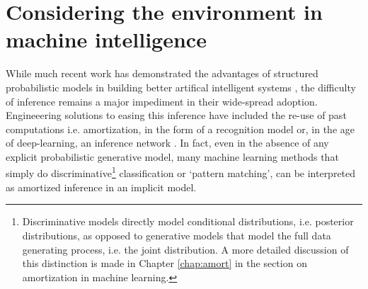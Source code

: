 
\section*{Considering the environment in machine intelligence}

While much recent work has demonstrated the advantages of structured probabilistic models in building better artifical intelligent systems \cite{lake2015human, del2013understanding, zhao2011image, steyvers2007probabilistic}, the difficulty of inference remains a major impediment in their wide-spread adoption. Engineeering solutions to easing this inference have included the re-use of past computations i.e. amortization, in the form of a recognition model\cite{dayan1995helmholtz, kingma2014auto} or, in the age of deep-learning, an inference network \citep{kulkarni2015picture, mnih2014neural, rezende2015variational, paige2016inference}. In fact, even in the absence of any explicit probabilistic generative model, many machine learning methods that simply do discriminative\footnote{Discriminative models directly model conditional distributions, i.e. posterior distributions, as opposed to generative models that model the full data generating process, i.e. the joint distribution. A more detailed discussion of this distinction is made in Chapter \ref{chap:amort} in the section on amortization in machine learning.} classification or `pattern matching', can be interpreted as amortized inference in an implicit model.%

